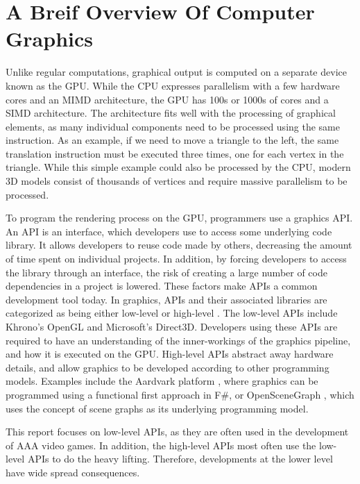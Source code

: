 \section{A Breif Overview Of Computer Graphics}
Unlike regular computations, graphical output is computed on a separate device known as the \gls{GPU}.
While the \gls{CPU} expresses parallelism with a few hardware cores and an \gls{MIMD} architecture, the \gls{GPU} has 100s or 1000s of cores and a \gls{SIMD} architecture\cite{intro_to_gpu_arch}.
The architecture fits well with the processing of graphical elements, as many individual components need to be processed using the same instruction.
As an example, if we need to move a triangle to the left, the same translation instruction must be executed three times, one for each vertex in the triangle.
While this simple example could also be processed by the \gls{CPU}, modern 3D models consist of thousands of vertices and require massive parallelism to be processed. 


To program the rendering process on the \gls{GPU}, programmers use a graphics \gls{API}. 
An \gls{API} is an interface, which developers use to access some underlying code library. 
It allows developers to reuse code made by others, decreasing the amount of time spent on individual projects.
In addition, by forcing developers to access the library through an interface, the risk of creating a large number of code dependencies in a project is lowered.
These factors make \glspl{API} a common development tool today.\cite{apiEvaluation}
In graphics, \glspl{API} and their associated libraries are categorized as being either low-level or high-level \cite{wikiGraphicsLibs}.
The low-level \glspl{API} include Khrono’s OpenGL\cite{wikipedia????opengl} and Microsoft’s Direct3D\cite{wikipedia????directx}. Developers using these \glspl{API} are required to have an understanding of the inner-workings of the graphics pipeline, and how it is executed on the \gls{GPU}.
High-level \glspl{API} abstract away hardware details, and allow graphics to be developed according to other programming models.
Examples include the Aardvark platform \cite{aardvark}, where graphics can be programmed using a functional first approach in F\#, or OpenSceneGraph \cite{openSceneGraph}, which uses the concept of scene graphs as its underlying programming model. 


This report focuses on low-level \glspl{API}, as they are often used in the development of AAA video games.
In addition, the high-level \glspl{API} most often use the low-level \glspl{API} to do the heavy lifting.
Therefore, developments at the lower level have wide spread consequences.


